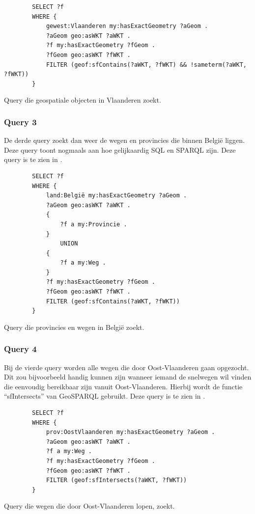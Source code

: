 \begin{listing}[ht]
    \begin{verbatim}
        SELECT ?f
        WHERE {
            gewest:Vlaanderen my:hasExactGeometry ?aGeom .
            ?aGeom geo:asWKT ?aWKT .
            ?f my:hasExactGeometry ?fGeom .
            ?fGeom geo:asWKT ?fWKT .
            FILTER (geof:sfContains(?aWKT, ?fWKT) && !sameterm(?aWKT, ?fWKT))
        }
    \end{verbatim}
    \caption{Query die geospatiale objecten in Vlaanderen zoekt.}
    \label{listing:find_everything_flanders}
\end{listing}


\subsubsection{Query 3}
De derde query zoekt dan weer de wegen en provincies die binnen België liggen. Deze query toont nogmaals aan hoe gelijkaardig SQL en SPARQL zijn. Deze query is te zien in .

\begin{listing}[ht]
    \begin{verbatim}
        SELECT ?f
        WHERE {
            land:België my:hasExactGeometry ?aGeom .
            ?aGeom geo:asWKT ?aWKT .
            {
                ?f a my:Provincie .
            }
                UNION
            {
                ?f a my:Weg .
            }
            ?f my:hasExactGeometry ?fGeom .
            ?fGeom geo:asWKT ?fWKT .
            FILTER (geof:sfContains(?aWKT, ?fWKT))
        }
    \end{verbatim}
    \caption{Query die provincies en wegen in België zoekt.}
    \label{listing:find_provinces_roads_belgium}
\end{listing}


\subsubsection{Query 4}
Bij de vierde query worden alle wegen die door Oost-Vlaanderen gaan opgezocht. Dit zou bijvoorbeeld handig kunnen zijn wanneer iemand de snelwegen wil vinden die eenvoudig bereikbaar zijn vanuit Oost-Vlaanderen. Hierbij wordt de functie ``sfIntersects'' van GeoSPARQL gebruikt. Deze query is te zien in .

\begin{listing}[ht]
    \begin{verbatim}
        SELECT ?f
        WHERE {
            prov:OostVlaanderen my:hasExactGeometry ?aGeom .
            ?aGeom geo:asWKT ?aWKT .
            ?f a my:Weg .
            ?f my:hasExactGeometry ?fGeom .
            ?fGeom geo:asWKT ?fWKT .
            FILTER (geof:sfIntersects(?aWKT, ?fWKT))
        }
    \end{verbatim}
    \caption{Query die wegen die door Oost-Vlaanderen lopen, zoekt.}
    \label{listing:find_roads_passing_east_flanders}
\end{listing}


